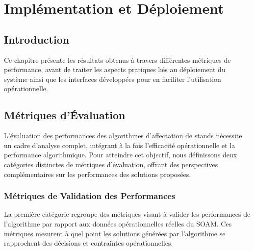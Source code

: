\chapter{Implémentation et Déploiement}
\vspace{-1.5em}
\chaptertoc
\vspace{-2.5em}
\section{Introduction}
Ce chapitre présente les résultats obtenus à travers différentes métriques de performance, avant de traiter les aspects pratiques liés au déploiement du système ainsi que les interfaces développées pour en faciliter l’utilisation opérationnelle.
\vspace{-1.2em}
\section{Métriques d’Évaluation}
\vspace{-1em}
L’évaluation des performances des algorithmes d’affectation de stands nécessite un cadre d’analyse complet, intégrant à la fois l’efficacité opérationnelle et la performance algorithmique. Pour atteindre cet objectif, nous définissons deux catégories distinctes de métriques d’évaluation, offrant des perspectives complémentaires sur les performances des solutions proposées.

\subsection{Métriques de Validation des Performances}

La première catégorie regroupe des métriques visant à valider les performances de l’algorithme par rapport aux données opérationnelles réelles du \ac{SOAM}. Ces métriques mesurent à quel point les solutions générées par l’algorithme se rapprochent des décisions et contraintes opérationnelles.

